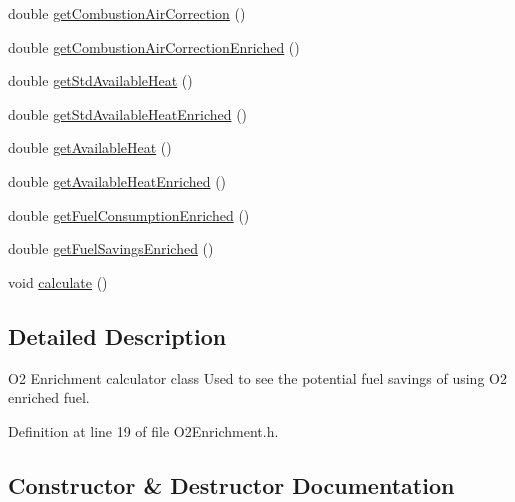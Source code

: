 \begin{DoxyCompactItemize}
\item 
double \hyperlink{class_o2_enrichment_a7ecca6a53529843246555ae33379d464}{get\+Combustion\+Air\+Correction} ()
\item 
double \hyperlink{class_o2_enrichment_aa8bbec67d760c83da77ce5b4ee01e41c}{get\+Combustion\+Air\+Correction\+Enriched} ()
\item 
double \hyperlink{class_o2_enrichment_a6eab50d08baaca010d208139cb99d239}{get\+Std\+Available\+Heat} ()
\item 
double \hyperlink{class_o2_enrichment_a24fd19f2aca20c7ba83061b832323ad6}{get\+Std\+Available\+Heat\+Enriched} ()
\item 
double \hyperlink{class_o2_enrichment_ac34e93c7e1444ab81a621428f0eee4d3}{get\+Available\+Heat} ()
\item 
double \hyperlink{class_o2_enrichment_afc7f9ea349f338ead76255218769a3e3}{get\+Available\+Heat\+Enriched} ()
\item 
double \hyperlink{class_o2_enrichment_aaf0dae071145b439e995d90f838878a7}{get\+Fuel\+Consumption\+Enriched} ()
\item 
double \hyperlink{class_o2_enrichment_a2aa9f8d3a02935931e705f82ae57c72f}{get\+Fuel\+Savings\+Enriched} ()
\item 
void \hyperlink{class_o2_enrichment_a91d7e18a336466cf9fbc0cae42dde282}{calculate} ()
\end{DoxyCompactItemize}


\subsection{Detailed Description}
O2 Enrichment calculator class Used to see the potential fuel savings of using O2 enriched fuel. 

Definition at line 19 of file O2\+Enrichment.\+h.



\subsection{Constructor \& Destructor Documentation}
\mbox{\label{class_o2_enrichment_a8d60cf5ef65e8528a5a432c7cec75699}} 
